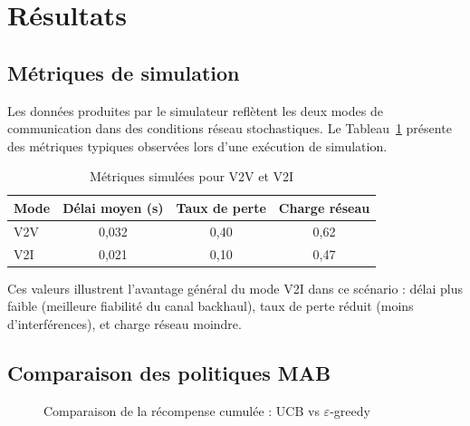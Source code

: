 \documentclass[12pt,a4paper]{article}
\begin{document}
\section{Résultats}
\label{sec:resultats}

\subsection{Métriques de simulation}

Les données produites par le simulateur reflètent les deux modes de communication
dans des conditions réseau stochastiques. Le Tableau~\ref{tab:metrics} présente
des métriques typiques observées lors d'une exécution de simulation.

\begin{table}[H]
\centering
\caption{Métriques simulées pour V2V et V2I}
\label{tab:metrics}
\begin{tabular}{@{}lccc@{}}
\toprule
\textbf{Mode} & \textbf{Délai moyen (s)} &
\textbf{Taux de perte} & \textbf{Charge réseau} \\
\midrule
V2V & 0{,}032 & 0{,}40 & 0{,}62 \\
V2I & 0{,}021 & 0{,}10 & 0{,}47 \\
\bottomrule
\end{tabular}
\end{table}

Ces valeurs illustrent l'avantage général du mode V2I dans ce scénario : délai
plus faible (meilleure fiabilité du canal backhaul), taux de perte réduit (moins
d'interférences), et charge réseau moindre.

\subsection{Comparaison des politiques MAB}

\begin{figure}[H]
\centering
{}
\caption{Comparaison de la récompense cumulée : UCB vs $\varepsilon$-greedy}
\label{fig:rewards}
\end{figure}
\end{document}

